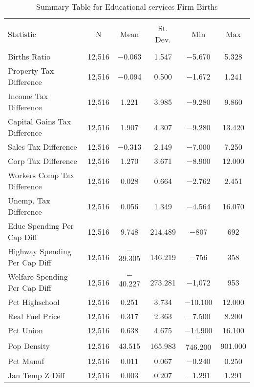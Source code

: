 
\begin{table}[!htbp] \centering 
  \caption{Summary Table for  Educational services Firm Births} 
  \label{61summary} 
\begin{tabular}{@{\extracolsep{5pt}}lccccc} 
\\[-1.8ex]\hline 
\hline \\[-1.8ex] 
Statistic & \multicolumn{1}{c}{N} & \multicolumn{1}{c}{Mean} & \multicolumn{1}{c}{St. Dev.} & \multicolumn{1}{c}{Min} & \multicolumn{1}{c}{Max} \\ 
\hline \\[-1.8ex] 
Births Ratio & 12,516 & $-$0.063 & 1.547 & $-$5.670 & 5.328 \\ 
Property Tax Difference & 12,516 & $-$0.094 & 0.500 & $-$1.672 & 1.241 \\ 
Income Tax Difference & 12,516 & 1.221 & 3.985 & $-$9.280 & 9.860 \\ 
Capital Gains Tax Difference & 12,516 & 1.907 & 4.307 & $-$9.280 & 13.420 \\ 
Sales Tax Difference & 12,516 & $-$0.313 & 2.149 & $-$7.000 & 7.250 \\ 
Corp Tax Difference & 12,516 & 1.270 & 3.671 & $-$8.900 & 12.000 \\ 
Workers Comp Tax Difference & 12,516 & 0.028 & 0.664 & $-$2.762 & 2.451 \\ 
Unemp. Tax Difference & 12,516 & 0.056 & 1.349 & $-$4.564 & 16.070 \\ 
Educ Spending Per Cap Diff & 12,516 & 9.748 & 214.489 & $-$807 & 692 \\ 
Highway Spending Per Cap Diff & 12,516 & $-$39.305 & 146.219 & $-$756 & 358 \\ 
Welfare Spending Per Cap Diff & 12,516 & $-$40.227 & 273.281 & $-$1,072 & 953 \\ 
Pct Highschool & 12,516 & 0.251 & 3.734 & $-$10.100 & 12.000 \\ 
Real Fuel Price & 12,516 & 0.317 & 2.363 & $-$7.500 & 8.200 \\ 
Pct Union & 12,516 & 0.638 & 4.675 & $-$14.900 & 16.100 \\ 
Pop Density & 12,516 & 43.515 & 165.983 & $-$746.200 & 901.000 \\ 
Pct Manuf & 12,516 & 0.011 & 0.067 & $-$0.240 & 0.250 \\ 
Jan Temp Z Diff & 12,516 & 0.003 & 0.207 & $-$1.291 & 1.291 \\ 

\end{tabular}
\end{table}
